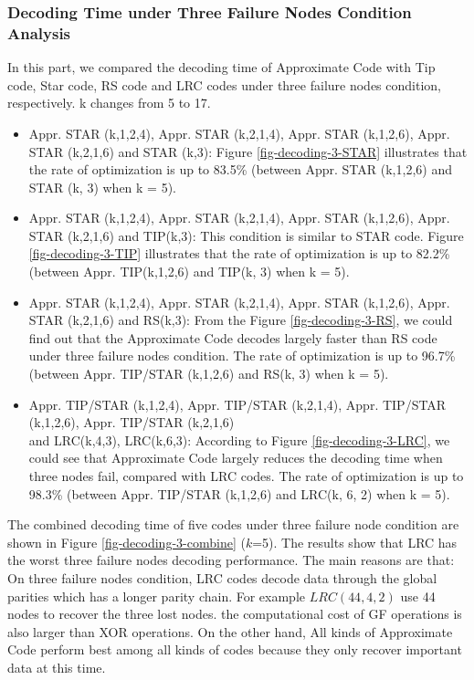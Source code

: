 \documentclass[sigconf]{acmart}
\begin{document}
\subsubsection{Decoding Time under Three Failure Nodes Condition Analysis}
In this part, we compared the decoding time of Approximate Code with Tip code, Star code, RS code and LRC codes under three failure nodes condition, respectively. k changes from 5 to 17. 
\begin{itemize}
    \item Appr. STAR (k,1,2,4), Appr. STAR (k,2,1,4), Appr. STAR (k,1,2,6), Appr. STAR (k,2,1,6) and STAR (k,3): Figure \ref{fig-decoding-3-STAR} illustrates that the rate of optimization is up to 83.5\% (between Appr. STAR (k,1,2,6) and STAR (k, 3) when k = 5). 
    \item Appr. STAR (k,1,2,4), Appr. STAR (k,2,1,4), Appr. STAR (k,1,2,6), Appr. STAR (k,2,1,6) and TIP(k,3): This condition is similar to STAR code. Figure \ref{fig-decoding-3-TIP} illustrates that the rate of optimization is up to 82.2\% (between Appr. TIP(k,1,2,6) and TIP(k, 3) when k = 5).
    \item Appr. STAR (k,1,2,4), Appr. STAR (k,2,1,4), Appr. STAR (k,1,2,6), Appr. STAR (k,2,1,6) and RS(k,3): From the Figure \ref{fig-decoding-3-RS}, we could find out that the Approximate Code decodes largely faster than RS code under three failure nodes condition. The rate of optimization is up to 96.7\% (between Appr. TIP/STAR (k,1,2,6) and RS(k, 3) when k = 5).
    \item Appr. TIP/STAR (k,1,2,4), Appr. TIP/STAR (k,2,1,4), Appr. TIP/STAR (k,1,2,6), Appr. TIP/STAR (k,2,1,6)  \\
    and LRC(k,4,3), LRC(k,6,3): 
    According to Figure \ref{fig-decoding-3-LRC}, we could see that Approximate Code largely reduces the decoding time when three nodes fail, compared with LRC codes. The rate of optimization is up to 98.3\%  (between Appr. TIP/STAR (k,1,2,6) and LRC(k, 6, 2) when k = 5).
\end{itemize}

The combined decoding time of five codes under three failure node condition are shown in Figure \ref{fig-decoding-3-combine} ($k$=5). The results show that LRC has the worst three failure nodes decoding performance. The main reasons are that: On three failure nodes condition, LRC codes decode data through the global parities which has a longer parity chain. For example $LRC(44,4,2)$ use 44 nodes to recover the three lost nodes. the computational cost of GF operations is also larger than XOR operations. On the other hand, All kinds of Approximate Code perform best among all kinds of codes because they only recover important data at this time.\par
\end{document}
